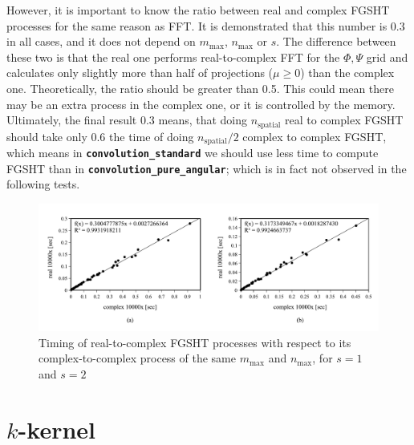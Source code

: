 However, it is important to know the ratio between real and complex
\acs{FGSHT} processes for the same reason as \acs{FFT}. It is demonstrated
that this number is 0.3 in all cases, and it does not depend on $m_{\max}$,
$n_{\max}$ or $s.$ The difference between these two is that the
real one performs real-to-complex \acs{FFT} for the $\Phi,\Psi$
grid and calculates only slightly more than half of projections ($\mu\geq0$)
than the complex one.\textcolor{red}{{} }Theoretically, the ratio should
be greater than 0.5. This could mean there may be an extra process
in the complex one, or it is controlled by the memory. Ultimately,
the final result 0.3 means, that doing $n_{\mathrm{spatial}}$ real
to complex \acs{FGSHT} should take only 0.6 the time of doing $n_{\mathrm{spatial}}/2$
complex to complex \acs{FGSHT}, which means in \texttt{\textbf{convolution\_standard}}
we should use less time to compute \acs{FGSHT} than in \texttt{\textbf{convolution\_pure\_angular}};
which is in fact not observed in the following tests.
\begin{center}
\begin{figure}[H]
\begin{centering}
\includegraphics[bb=0bp 20bp 680bp 235bp,width=1\columnwidth]{_figure/results/fgsht_real_v_cmplx}
\par\end{centering}
\caption[Timing of real-to-complex \acs{FGSHT} processes with respect to its
complex-to-complex process of the same $m_{\max}$ and $n_{\max}$]{Timing of real-to-complex \acs{FGSHT} processes with respect to
its complex-to-complex process of the same $m_{\max}$ and $n_{\max}$,
for $s=1$ and $s=2$\label{fig:fgsht-real-to-complex}}
\end{figure}
\par\end{center}

\section{$k$-kernel\label{sec:-kernel}}

